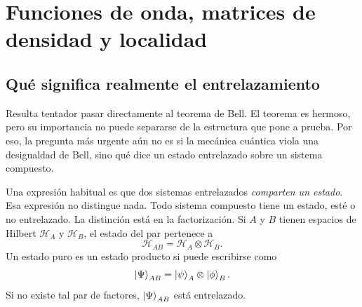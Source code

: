 \chapter{Funciones de onda, matrices de densidad y localidad}


\section{Qué significa realmente el entrelazamiento}

Resulta tentador pasar directamente al teorema de Bell. El teorema es hermoso, pero su importancia no puede separarse de la estructura que pone a prueba. Por eso, la pregunta más urgente aún no es si la mecánica cuántica viola una desigualdad de Bell, sino qué dice un estado entrelazado sobre un sistema compuesto.

Una expresión habitual es que dos sistemas entrelazados \emph{comparten un estado}. Esa expresión no distingue nada. Todo sistema compuesto tiene un estado, esté o no entrelazado. La distinción está en la factorización. Si \(A\) y \(B\) tienen espacios de Hilbert \(\mathcal H_A\) y \(\mathcal H_B\), el estado del par pertenece a
\begin{equation}
\mathcal H_{AB}=\mathcal H_A\otimes\mathcal H_B.
\end{equation}
Un estado puro es un estado producto si puede escribirse como
\begin{equation}
\left\lvert\Psi\right\rangle_{AB}=\left\lvert\psi\right\rangle_A\otimes\left\lvert\phi\right\rangle_B.
\label{eq:l7-product-state}
\end{equation}
Si no existe tal par de factores, \(\left\lvert\Psi\right\rangle_{AB}\) está entrelazado.

